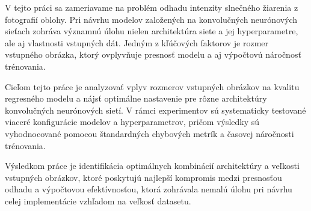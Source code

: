 V tejto práci sa zameriavame na problém odhadu intenzity slnečného žiarenia 
z fotografií oblohy. Pri návrhu modelov založených na konvolučných neurónových sieťach zohráva významnú úlohu nielen architektúra siete a jej hyperparametre,
 ale aj vlastnosti vstupných dát. Jedným z kľúčových faktorov je rozmer vstupného obrázka, ktorý ovplyvňuje 
 presnosť modelu a aj výpočtovú náročnosť trénovania.

Cieľom tejto práce je analyzovať vplyv rozmerov vstupných obrázkov na kvalitu regresného modelu a nájsť 
optimálne nastavenie pre rôzne architektúry konvolučných neurónových sietí. V rámci experimentov sú systematicky 
testované viaceré konfigurácie modelov a hyperparametrov, pričom výsledky sú vyhodnocované pomocou štandardných
 chybových metrík a časovej náročnosti trénovania.

Výsledkom práce je identifikácia optimálnych kombinácií architektúry a veľkosti vstupných obrázkov, ktoré poskytujú 
najlepší kompromis medzi presnosťou odhadu a výpočtovou efektívnosťou, ktorá zohrávala nemalú úlohu pri návrhu celej implementácie
vzhľadom na veľkosť datasetu.